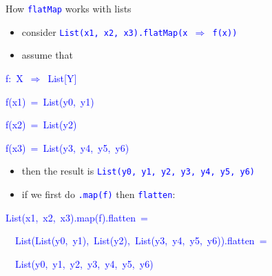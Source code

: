 \documentclass[english]{beamer}
\newenvironment{lyxcode}
   {\par\begin{list}{}{
     \setlength{\rightmargin}{\leftmargin}
     \setlength{\listparindent}{0pt}%
     \raggedright
     \setlength{\itemsep}{0pt}
     \setlength{\parsep}{0pt}
     \normalfont\ttfamily}%
    \def\{{\char`\{}
    \def\}{\char`\}}
    \def\textasciitilde{\char`\~}
    \item[]}
   {\end{list}}
\begin{document}
\begin{frame}{How \texttt{\textcolor{blue}{\footnotesize{}flatMap}} works with lists}

\begin{itemize}
\item consider \texttt{\textcolor{blue}{\footnotesize{}List(x1, x2, x3).flatMap(x
$\Rightarrow$ f(x))}} 
\item assume that 
\end{itemize}
\begin{lyxcode}
\textcolor{blue}{\footnotesize{}f:~X~$\Rightarrow$~List{[}Y{]}}{\footnotesize \par}

\textcolor{blue}{\footnotesize{}f(x1)~=~List(y0,~y1)}{\footnotesize \par}

\textcolor{blue}{\footnotesize{}f(x2)~=~List(y2)}{\footnotesize \par}

\textcolor{blue}{\footnotesize{}f(x3)~=~List(y3,~y4,~y5,~y6)}{\footnotesize \par}
\end{lyxcode}
\begin{itemize}
\item then the result is \texttt{\textcolor{blue}{\footnotesize{}List(y0,
y1, y2, y3, y4, y5, y6)}} 
\item if we first do \texttt{\textcolor{blue}{\footnotesize{}.map(f)}} then
\texttt{\textcolor{blue}{\footnotesize{}flatten}}:
\end{itemize}
\begin{lyxcode}
\textcolor{blue}{\footnotesize{}List(x1,~x2,~x3).map(f).flatten~=}{\footnotesize \par}

\textcolor{blue}{\footnotesize{}~~List(List(y0,~y1),~List(y2),~List(y3,~y4,~y5,~y6)).flatten~=}{\footnotesize \par}

\textcolor{blue}{\footnotesize{}~~List(y0,~y1,~y2,~y3,~y4,~y5,~y6)}~
\end{lyxcode}
\end{frame}
\end{document}
